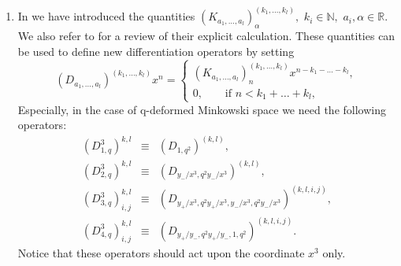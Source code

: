 \documentclass[a4paper,11pt,oneside]{article}
\newcommand{\text}[1]{\mbox{#1}}
\begin{document}
\begin{enumerate}
\item  In \cite{BW01} we have introduced the quantities $\left(
K_{a_{1},\ldots ,a_{l}}\right) _{\alpha }^{\left( k_{1},\ldots ,k_{l}\right)
},$ $k_{i}\in \mathbb{N},$ $a_{i},\alpha \in \mathbb{R}$. We also refer to \cite
{BW01} for a review of their explicit calculation. These quantities can be
used to define new differentiation operators by setting 
\begin{equation}
\left( D_{a_{1},\ldots ,a_{l}}\right) ^{\left( k_{1},\ldots ,k_{l}\right)
}x^{n}=\left\{ 
\begin{array}{c}
\left( K_{a_{1},\ldots ,a_{l}}\right) _{n}^{\left( k_{1},\ldots
,k_{l}\right) }x^{n-k_{1}-\ldots -k_{l}}, \\ 
0,\qquad \text{if }n<k_{1}+\ldots +k_{l},
\end{array}
\right.
\end{equation}
Especially, in the case of q-deformed Minkowski space we need the following
operators: 
\begin{eqnarray}
\left( D_{1,q}^{3}\right) ^{k,l} &\equiv &\left( D_{1,q^{2}}\right) ^{\left(
k,l\right) }, \\
\left( D_{2,q}^{3}\right) ^{k,l} &\equiv &\left(
D_{y_{-}/x^{3},q^{2}y_{-}/x^{3}}\right) ^{\left( k,l\right) },  \nonumber \\
\left( D_{3,q}^{3}\right) _{i,j}^{k,l} &\equiv &\left(
D_{y_{+}/x^{3},q^{2}y_{+}/x^{3},y_{-}/x^{3},q^{2}y_{-}/x^{3}}\right)
^{\left( k,l,i,j\right) },  \nonumber \\
\left( D_{4,q}^{3}\right) _{i,j}^{k,l} &\equiv &\left(
D_{y_{+}/y_{-},q^{2}y_{+}/y_{-},1,q^{2}}\right) ^{\left( k,l,i,j\right) }. 
\nonumber
\end{eqnarray}
Notice that these operators should act upon the coordinate $x^{3}$ only.


\end{enumerate}
\end{document}
